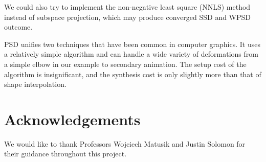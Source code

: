 \documentclass[11pt,twocolumn,letterpaper]{article}
\begin{document}
We could also try to implement the non-negative least square (NNLS) method instead of subspace projection, which may produce converged SSD and WPSD outcome.

PSD unifies two techniques that have been common in computer graphics. It uses a relatively simple algorithm and can handle a wide variety of deformations from a simple elbow in our example to secondary animation. The setup cost of the algorithm is insignificant, and the synthesis cost is only slightly more than that of shape interpolation.

\section*{Acknowledgements}

We would like to thank Professors Wojciech Matusik and Justin Solomon for their guidance throughout this project.



\end{document}
